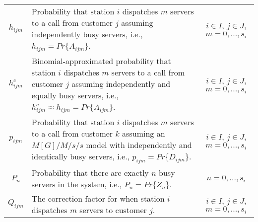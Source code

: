 \documentclass[11pt]{article}\topmargin 0mm
\begin{document}
\begin{table}
{\begin{tabular}{c p{3.8in} c}
$h_{ijm}$ & Probability that station $i$ dispatches $m$ servers to a call from customer $j$ assuming independently busy servers, i.e., $h_{ijm}=Pr\{A_{ijm}\}$. & $i\in I$, $j\in J$, $m=0,...,s_i$\\
$h^c_{ijm}$ & Binomial-approximated probability that station $i$ dispatches $m$ servers to a call from customer $j$ assuming independently and equally busy servers, i.e., $h_{ijm}^c \approx h_{ijm}=Pr\{A_{ijm}\}$. & $i\in I$, $j\in J$, $m=0,...,s_i$  \\
$p_{ijm}$ & Probability that station $i$ dispatches $m$ servers to a call from customer $k$ assuming an $M[G]/M/s/s$ model with independently and identically busy servers, i.e., $p_{ijm}=Pr\{D_{ijm}\}$. & $i\in I$, $j\in J$, $m=0,...,s_i$ \\
$P_n$ & Probability that there are exactly $n$ busy servers in the system, i.e., $P_n=Pr\{Z_n\}$. & $n=0,...,s_i$\\
$Q_{ijm}$ & The correction factor for when station $i$ dispatches $m$ servers to customer $j$. & $i\in I$, $j\in J$, $m=0,...,s_i$ \\

\end{tabular}}
\end{table}
\end{document}

